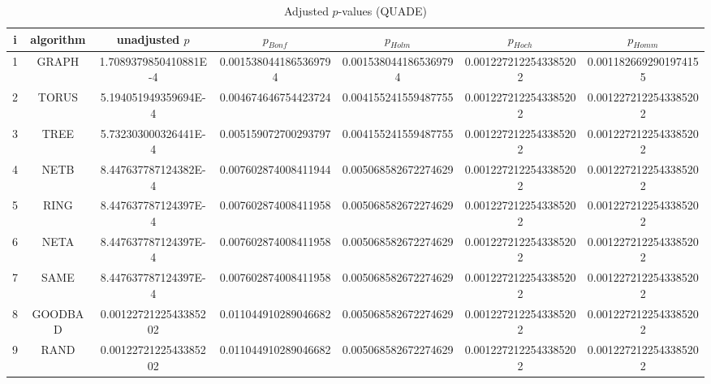 \documentclass[a4paper,10pt]{article}
\begin{document}
\begin{landscape}
\begin{table}[!htp]
\centering\scriptsize
\caption{Adjusted $p$-values (QUADE)}
\begin{tabular}{ccccccc}
i&algorithm&unadjusted $p$&$p_{Bonf}$&$p_{Holm}$&$p_{Hoch}$&$p_{Homm}$\\
\hline
1& GRAPH&1.7089379850410881E-4&0.0015380441865369794&0.0015380441865369794&0.0012272122543385202&0.0011826692901974155\\
2& TORUS&5.194051949359694E-4&0.004674646754423724&0.004155241559487755&0.0012272122543385202&0.0012272122543385202\\
3& TREE&5.732303000326441E-4&0.005159072700293797&0.004155241559487755&0.0012272122543385202&0.0012272122543385202\\
4& NETB&8.447637787124382E-4&0.007602874008411944&0.005068582672274629&0.0012272122543385202&0.0012272122543385202\\
5& RING&8.447637787124397E-4&0.007602874008411958&0.005068582672274629&0.0012272122543385202&0.0012272122543385202\\
6& NETA&8.447637787124397E-4&0.007602874008411958&0.005068582672274629&0.0012272122543385202&0.0012272122543385202\\
7& SAME&8.447637787124397E-4&0.007602874008411958&0.005068582672274629&0.0012272122543385202&0.0012272122543385202\\
8& GOODBAD&0.0012272122543385202&0.011044910289046682&0.005068582672274629&0.0012272122543385202&0.0012272122543385202\\
9& RAND&0.0012272122543385202&0.011044910289046682&0.005068582672274629&0.0012272122543385202&0.0012272122543385202\\
\hline
\end{tabular}
\end{table}


\end{landscape}
\end{document}
